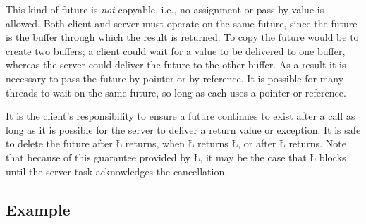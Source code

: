 \documentclass[openright,twoside]{report}
\begin{document}
This kind of future is \emph{not} copyable, i.e., no assignment or pass-by-value is allowed.
Both client and server must operate on the same future, since the future is the buffer through which the result is returned.
To copy the future would be to create two buffers;
a client could wait for a value to be delivered to one buffer, whereas the server could deliver the future to the other buffer.
As a result it is necessary to pass the future by pointer or by reference.
It is possible for many threads to wait on the same future, so long as each uses a pointer or reference.

It is the client's responsibility to ensure a future continues to exist after a call as long as it is possible for the server to deliver a return value or exception.
It is safe to delete the future after \LGinlinetrue\LGbegin\lgrinde\L{}\endlgrinde\LGend{} returns, when \LGinlinetrue\LGbegin\lgrinde\L{}\endlgrinde\LGend{} returns \LGinlinetrue\LGbegin\lgrinde\L{}\endlgrinde\LGend{}, or after \LGinlinetrue\LGbegin\lgrinde\L{}\endlgrinde\LGend{} returns.
Note that because of this guarantee provided by \LGinlinetrue\LGbegin\lgrinde\L{}\endlgrinde\LGend{}, it may be the case that \LGinlinetrue\LGbegin\lgrinde\L{}\endlgrinde\LGend{} blocks until the server task acknowledges the cancellation.


\subsection{Example}
\end{document}
